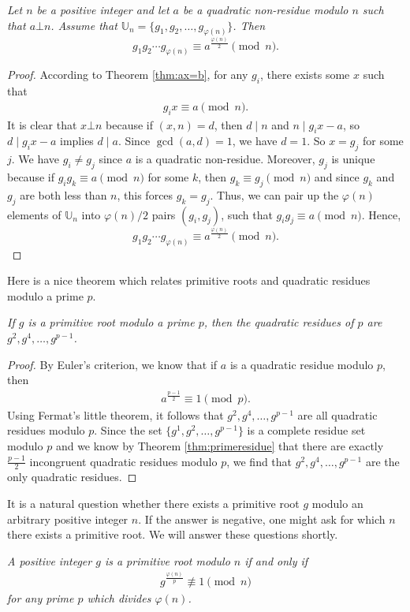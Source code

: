 \documentclass{subfile}
\begin{document}
	\begin{theorem}\slshape\label{prd}
		Let $n$ be a positive integer and let $a$ be a quadratic non-residue modulo $n$ such that $a\bot n$. Assume that $\mathbb U_n = \{g_1, g_2, \ldots, g_{\varphi(n)}\}$. Then
		\[g_1g_2\cdots g_{\varphi(n)}\equiv a^{\frac{\varphi(n)}{2}}\pmod n.\]
	\end{theorem}

	\begin{proof}
		According to Theorem \ref{thm:ax=b}, for any $g_i$, there exists some $x$ such that
			\begin{align}
				g_i x\equiv a\pmod n.
			\end{align}
		It is clear that $x \bot n$ because if $(x,n)=d$, then $d\mid n$ and $n\mid g_{i}x-a$, so $d\mid g_ix-a$ implies $d\mid a$. Since $\gcd(a,d)=1$, we have $d=1$. So $x=g_j$ for some $j$. We have $g_i \neq g_j$ since $a$ is a quadratic non-residue. Moreover, $g_j$ is unique because if $g_ig_k \equiv a \pmod n$ for some $k$, then $g_k \equiv g_j \pmod n$ and since $g_k$ and $g_j$ are both less than $n$, this forces $g_k=g_j$. Thus, we can pair up the $\varphi(n)$ elements of $\mathbb{U}_n$ into $\varphi(n)/2$ pairs $(g_i, g_j)$, such that $g_ig_j \equiv a \pmod n$. Hence,
			\begin{equation*}
			g_1g_2\cdots g_{\varphi(n)}\equiv a^{\frac{\varphi(n)}{2}}\pmod n.
			\end{equation*}
	\end{proof}
Here is a nice theorem which relates primitive roots and quadratic residues modulo a prime $p$.
	\begin{theorem}\slshape\label{thm:pr+qr}
		If $g$ is a primitive root modulo a prime $p$, then the quadratic residues of $p$ are $g^2,g^4,\ldots,g^{p-1}$.
	\end{theorem}

	\begin{proof}
		By Euler's criterion, we know that if $a$ is a quadratic residue modulo $p$, then
			\begin{align*}
				a^{\frac{p-1}{2}} \equiv 1 \pmod p.
			\end{align*}
		Using Fermat's little theorem, it follows that $g^2,g^4,\ldots,g^{p-1}$ are all quadratic residues modulo $p$. Since the set $\{g^1,g^2,\ldots,g^{p-1}\}$ is a complete residue set modulo $p$ and we know by Theorem \ref{thm:primeresidue} that there are exactly $\frac{p-1}{2}$ incongruent quadratic residues modulo $p$, we find that $g^2,g^4,\ldots,g^{p-1}$ are the only quadratic residues.
	\end{proof}
It is a natural question whether there exists a primitive root $g$ modulo an arbitrary positive integer $n$. If the answer is negative, one might ask for which $n$ there exists a primitive root. We will answer these questions shortly.
	\begin{theorem}\slshape\label{thm:prTest}
		A positive integer $g$ is a primitive root modulo $n$ if and only if
			\begin{align*}
				g^{\frac{\varphi(n)}{p}}\not\equiv1\pmod n
			\end{align*}
		for any prime $p$ which divides $\varphi(n)$.
	\end{theorem}
\end{document}

